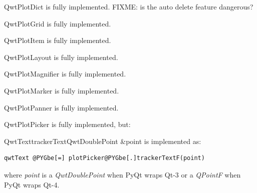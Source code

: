 \documentclass[a4paper,10pt,english]{manual}
\begin{document}
\hypertarget{PyQt4.Qwt5.QwtPlotDict}{}\begin{classdesc}{QwtPlotDict}{}
is fully implemented. FIXME: is the auto delete feature dangerous?
\end{classdesc}

\hypertarget{PyQt4.Qwt5.QwtPlotGrid}{}\begin{classdesc}{QwtPlotGrid}{}
is fully implemented.
\end{classdesc}

\hypertarget{PyQt4.Qwt5.QwtPlotItem}{}\begin{classdesc}{QwtPlotItem}{}
is fully implemented.
\end{classdesc}

\hypertarget{PyQt4.Qwt5.QwtPlotLayout}{}\begin{classdesc}{QwtPlotLayout}{}
is fully implemented.
\end{classdesc}

\hypertarget{PyQt4.Qwt5.QwtPlotMagnifier}{}\begin{classdesc}{QwtPlotMagnifier}{}
is fully implemented.
\end{classdesc}

\hypertarget{PyQt4.Qwt5.QwtPlotMarker}{}\begin{classdesc}{QwtPlotMarker}{}
is fully implemented.
\end{classdesc}

\hypertarget{PyQt4.Qwt5.QwtPlotPanner}{}\begin{classdesc}{QwtPlotPanner}{}
is fully implemented.
\end{classdesc}

\hypertarget{PyQt4.Qwt5.QwtPlotPicker}{}\begin{classdesc}{QwtPlotPicker}{}
is fully implemented, but:

\hypertarget{trackerText}{}\begin{cfuncdesc}{QwtText}{trackerText}{QwtDoublePoint \&point}
is implemented as:

\begin{Verbatim}[commandchars=@\[\]]
qwtText @PYGbe[=] plotPicker@PYGbe[.]trackerTextF(point)
\end{Verbatim}

where \emph{point} is a \emph{QwtDoublePoint} when PyQt wraps Qt-3 or a
\emph{QPointF} when PyQt wraps Qt-4.
\end{cfuncdesc}
\end{classdesc}
\end{document}
